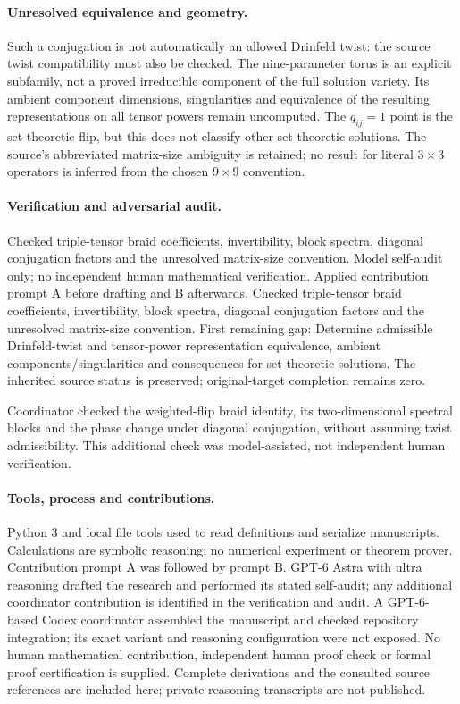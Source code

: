 \documentclass[11pt]{article}
\begin{document}
\paragraph{Unresolved equivalence and geometry.} Such a conjugation is not automatically an allowed Drinfeld twist: the source twist compatibility must also be checked. The nine-parameter torus is an explicit subfamily, not a proved irreducible component of the full solution variety. Its ambient component dimensions, singularities and equivalence of the resulting representations on all tensor powers remain uncomputed. The \(q_{ij}=1\) point is the set-theoretic flip, but this does not classify other set-theoretic solutions. The source's abbreviated matrix-size ambiguity is retained; no result for literal \(3\times3\) operators is inferred from the chosen \(9\times9\) convention.

\paragraph{Verification and adversarial audit.}
Checked triple-tensor braid coefficients, invertibility, block spectra, diagonal conjugation factors and the unresolved matrix-size convention. Model self-audit only; no independent human mathematical verification. Applied contribution prompt A before drafting and B afterwards. Checked triple-tensor braid coefficients, invertibility, block spectra, diagonal conjugation factors and the unresolved matrix-size convention. First remaining gap: Determine admissible Drinfeld-twist and tensor-power representation equivalence, ambient components/singularities and consequences for set-theoretic solutions. The inherited source status is preserved; original-target completion remains zero.

Coordinator checked the weighted-flip braid identity, its two-dimensional spectral blocks and the phase change under diagonal conjugation, without assuming twist admissibility. This additional check was model-assisted, not independent human verification.

\paragraph{Tools, process and contributions.}
Python 3 and local file tools used to read definitions and serialize manuscripts. Calculations are symbolic reasoning; no numerical experiment or theorem prover. Contribution prompt A was followed by prompt B. GPT-6 Astra with ultra reasoning drafted the research and performed its stated self-audit; any additional coordinator contribution is identified in the verification and audit. A GPT-6-based Codex coordinator assembled the manuscript and checked repository integration; its exact variant and reasoning configuration were not exposed. No human mathematical contribution, independent human proof check or formal proof certification is supplied. Complete derivations and the consulted source references are included here; private reasoning transcripts are not published.
\end{document}
